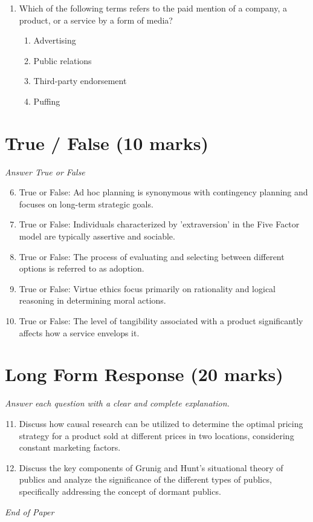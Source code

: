\documentclass[12pt]{article}
\begin{document}
\begin{enumerate}[label=\arabic*.]
\begin{enumerate}[label=(\alph*)]
    \item Research and evaluation
    \item Strategy and evaluation
    \item Strategy and implementation
    \item Objectives and implementation
\end{enumerate}
\item Which of the following terms refers to the paid mention of a company, a product, or a service by a form of media?
\begin{enumerate}[label=(\alph*)]
    \item Advertising
    \item Public relations
    \item Third-party endorsement
    \item Puffing
\end{enumerate}
\end{enumerate}

\section*{True / False (10 marks)}
\textit{Answer True or False}
\begin{enumerate}[label=\arabic*.]
\setcounter{enumi}{5}
\item True or False: Ad hoc planning is synonymous with contingency planning and focuses on long-term strategic goals.
\item True or False: Individuals characterized by 'extraversion' in the Five Factor model are typically assertive and sociable.
\item True or False: The process of evaluating and selecting between different options is referred to as adoption.
\item True or False: Virtue ethics focus primarily on rationality and logical reasoning in determining moral actions.
\item True or False: The level of tangibility associated with a product significantly affects how a service envelops it.
\end{enumerate}

\section*{Long Form Response (20 marks)}
\textit{Answer each question with a clear and complete explanation.}
\begin{enumerate}[label=\arabic*.]
\setcounter{enumi}{10}
\item Discuss how causal research can be utilized to determine the optimal pricing strategy for a product sold at different prices in two locations, considering constant marketing factors.
\item Discuss the key components of Grunig and Hunt's situational theory of publics and analyze the significance of the different types of publics, specifically addressing the concept of dormant publics.
\end{enumerate}

\vfill
\noindent\textit{End of Paper}
\end{document}
